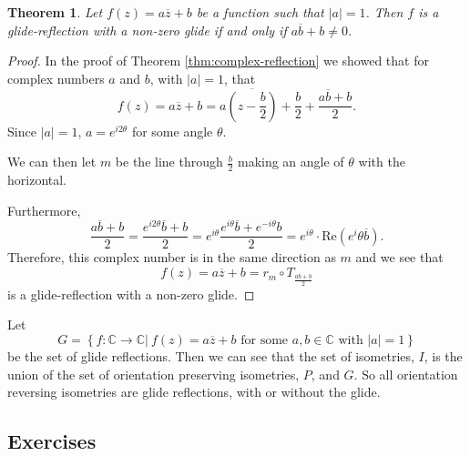 \documentclass[
]{book}
\newtheorem{theorem}{Theorem}[chapter]
\theoremstyle{definition}
\theoremstyle{definition}
\theoremstyle{definition}
\theoremstyle{definition}
\theoremstyle{remark}
\begin{document}
\begin{theorem}
Let \(f(z)=a\overline{z} + b\) be a function such that \(|a|=1\). Then \(f\) is a glide-reflection with a non-zero glide if and only if \(a\overline{b}+b\neq 0\).
\end{theorem}

\begin{proof}
In the proof of Theorem \ref{thm:complex-reflection} we showed that for complex numbers \(a\) and \(b\), with \(|a|=1\), that
\[f(z)=a\overline{z}+b =  a \overline{ \left( z-\frac{b}{2}\right)} + \frac{b}{2} + \frac{a\overline{b}+b}{2}.\]
Since \(|a|=1\), \(a = e^{i2 \theta}\) for some angle \(\theta\).

We can then let \(m\) be the line through \(\frac{b}{2}\) making an angle of \(\theta\) with the horizontal.

Furthermore,
\[\frac{a\overline{b}+b}{2} = \frac{e^{i2\theta}\overline{b} + b}{2} = e^{i\theta} \frac{ e^{i \theta} \overline{b} + e^{-i\theta} b}{2} = e^{i \theta} \cdot \mbox{Re}\left( e^i \theta \overline{b}\right).\]
Therefore, this complex number is in the same direction as \(m\) and we see that
\[f(z)=a \overline{z} + b = r_m \circ T_{\frac{a\overline{b}+b}{2}}\] is a glide-reflection with a non-zero glide.
\end{proof}

Let
\[G = \left\{ f : \mathbb{C} \rightarrow \mathbb{C} \vert \: f(z)= a \overline{z}+b \mbox{ for some } a,b\in \mathbb{C} \mbox{ with } |a|=1 \right\}\] be the set of glide reflections. Then we can see that the set of isometries, \(I\), is the union of the set of orientation preserving isometries, \(P\), and \(G\). So all orientation reversing isometries are glide reflections, with or without the glide.

\hypertarget{exercises-55}{%
\subsection{Exercises}\label{exercises-55}}
\end{document}

